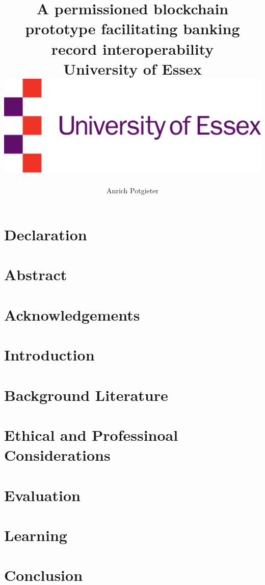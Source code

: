 \documentclass[12pt]{report}
\title{
    {A permissioned blockchain prototype facilitating banking record interoperability}\\
    {\large University of Essex}\\
    {\includegraphics{university.jpg}}
    }
\author{Anrich Potgieter}
\begin{document}
    
    \maketitle

    \tableofcontents
    
    \section*{Declaration}

    \section*{Abstract}

    \section*{Acknowledgements}

    \section{Introduction}

    \section{Background Literature}

    \section{Ethical and Professinoal Considerations}

    \section{Evaluation}

    \section{Learning}

    \section{Conclusion}

    \printbibliography

    \appendix
\end{document}
